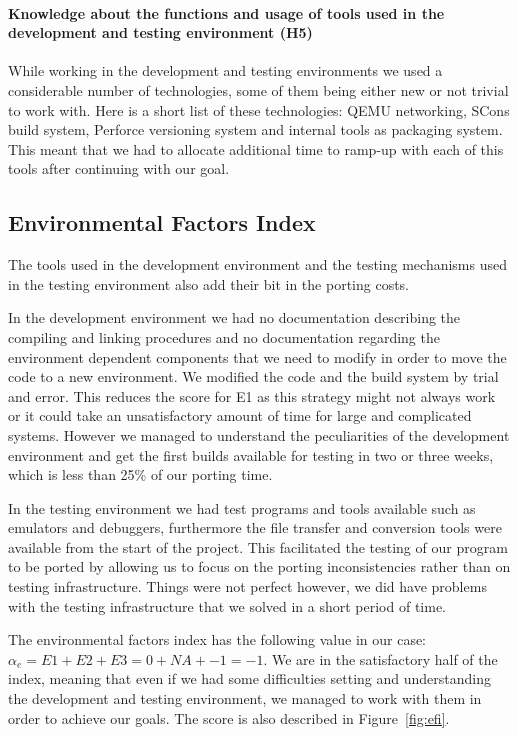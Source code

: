 \paragraph{Knowledge about the functions and usage of tools used in the development
and testing environment (H5)}
While working in the development and testing environments we used a considerable
number of technologies, some of them being either new or not trivial to work
with. Here is a short list of these technologies: QEMU networking, SCons build
system, Perforce versioning system and internal tools as packaging system. This
meant that we had to allocate additional time to ramp-up with each of this tools
after continuing with our goal.

\subsection{Environmental Factors Index}

The tools used in the development environment and the testing mechanisms used in
the testing environment also add their bit in the porting costs.

In the development environment we had no documentation describing the compiling
and linking procedures and no documentation regarding the environment dependent
components that we need to modify in order to move the code to a new
environment. We modified the code and the build system by trial and error. This
reduces the score for E1 as this strategy might not always work or it could take
an unsatisfactory amount of time for large and complicated systems. However
we managed to understand the peculiarities of the development environment and
get the first builds available for testing in two or three weeks, which is less
than 25\% of our porting time.

In the testing environment we had test programs and tools available such as
emulators and debuggers, furthermore the file transfer and conversion tools
were available from the start of the project. This facilitated the testing of
our program to be ported by allowing us to focus on the porting inconsistencies
rather than on testing infrastructure. Things were not perfect however, we did
have problems with the testing infrastructure that we solved in a short period
of time.

The environmental factors index has the following value in our case: $\alpha_e =
E1 + E2 + E3 = 0 + NA + -1 = -1$. We are in the satisfactory half of the index,
meaning that even if we had some difficulties setting and understanding the
development and testing environment, we managed to work with them in order to
achieve our goals. The score is also described in Figure~\ref{fig:efi}.

